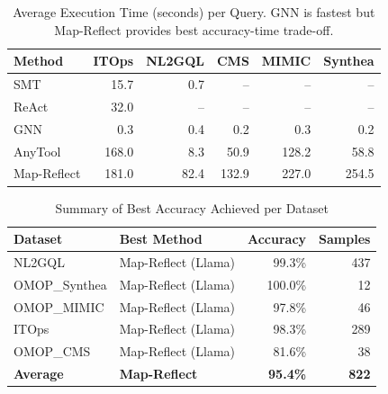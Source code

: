 \begin{table}[htbp]
\centering
\caption{Average Execution Time (seconds) per Query. GNN is fastest but Map-Reflect provides best accuracy-time trade-off.}
\label{tab:execution_time}
\begin{tabular}{lrrrrr}
\toprule
\textbf{Method} & \textbf{ITOps} & \textbf{NL2GQL} & \textbf{CMS} & \textbf{MIMIC} & \textbf{Synthea} \\
\midrule
SMT & 15.7 & 0.7 & -- & -- & -- \\
ReAct & 32.0 & -- & -- & -- & -- \\
GNN & 0.3 & 0.4 & 0.2 & 0.3 & 0.2 \\
AnyTool & 168.0 & 8.3 & 50.9 & 128.2 & 58.8 \\
Map-Reflect & 181.0 & 82.4 & 132.9 & 227.0 & 254.5 \\
\bottomrule
\end{tabular}
\end{table}

\begin{table}[htbp]
\centering
\caption{Summary of Best Accuracy Achieved per Dataset}
\label{tab:summary}
\begin{tabular}{llrr}
\toprule
\textbf{Dataset} & \textbf{Best Method} & \textbf{Accuracy} & \textbf{Samples} \\
\midrule
NL2GQL & Map-Reflect (Llama) & 99.3\% & 437 \\
OMOP\_Synthea & Map-Reflect (Llama) & 100.0\% & 12 \\
OMOP\_MIMIC & Map-Reflect (Llama) & 97.8\% & 46 \\
ITOps & Map-Reflect (Llama) & 98.3\% & 289 \\
OMOP\_CMS & Map-Reflect (Llama) & 81.6\% & 38 \\
\midrule
\textbf{Average} & \textbf{Map-Reflect} & \textbf{95.4\%} & \textbf{822} \\
\bottomrule
\end{tabular}
\end{table}

